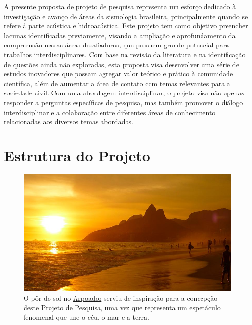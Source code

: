 \documentclass[10pt,a4paper,oneside]{book}
\newcommand{\HeroFigPad}{\vspace{-1cm}}
\begin{document}
\bigskip	

A presente proposta de projeto de pesquisa representa um esforço dedicado à investigação e avanço de áreas da sismologia brasileira, principalmente quando se refere à parte acústica e hidroacústica. Este projeto tem como objetivo preencher lacunas identificadas previamente, visando a ampliação e aprofundamento da compreensão nessas áreas desafiadoras, que possuem grande potencial para trabalhos interdisciplinares. Com base na revisão da literatura e na identificação de questões ainda não exploradas, esta proposta visa desenvolver uma série de estudos inovadores que possam agregar valor teórico e prático à comunidade científica, além de aumentar a área de contato com temas relevantes para a sociedade civil. Com uma abordagem interdisciplinar, o projeto visa não apenas responder a perguntas específicas de pesquisa, mas também promover o diálogo interdisciplinar e a colaboração entre diferentes áreas de conhecimento relacionadas aos diversos temas abordados.


\chapter{Estrutura do Projeto}
\label{cap_estrutura}

\begin{figure}[h]
	\HeroFigPad
	\begin{center}
		\includegraphics[width=\textwidth]{images/arpoador.jpg}
	\end{center}
	\caption{
	O pôr do sol no \href{https://pt.wikipedia.org/wiki/Arpoador}{Arpoador} serviu de inspiração para a concepção deste Projeto de Pesquisa, uma vez que representa um espetáculo fenomenal que une o céu, o mar e a terra.
    }
 \label{fig_arpoador}
\end{figure}
\end{document}
